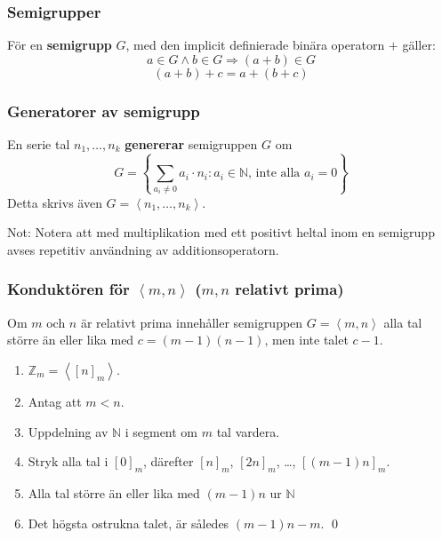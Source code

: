 \documentclass{beamer}
\begin{document}
\begin{frame}
	\frametitle{Semigrupper}
\begin{Definition}
	För en \textbf{semigrupp} $G$, med den implicit definierade binära operatorn $+$ gäller:
	\[a \in G \wedge b \in G \Longrightarrow (a + b) \in G\]
	\[(a+b)+c = a+(b+c)\]
\end{Definition}
\end{frame}

\begin{frame}
	\frametitle{Generatorer av semigrupp}
\begin{Definition}
	En serie tal $n_1, \ldots, n_k$ \textbf{genererar} semigruppen $G$ om
	\[G = \left\{\sum_{a_i\neq 0} a_i \cdot n_i : a_i \in \mathbb{N}\text{, inte alla $a_i=0$}\right\}\]
	Detta skrivs även $G = \left<n_1, \ldots, n_k \right>$.
\end{Definition}

\vspace{20pt}
\scriptsize Not: Notera att med multiplikation med ett positivt heltal inom en semigrupp avses repetitiv användning av additionsoperatorn.
\end{frame}

\begin{frame}
	\frametitle{Konduktören för $\left<m,n\right>$ ($m, n$ relativt prima)}
\begin{Theorem}
	Om $m$ och $n$ är relativt prima innehåller semigruppen $G = \left<m, n\right>$ alla tal större än eller lika med $c = (m - 1)(n - 1)$, men inte talet $c - 1$.
\end{Theorem}

\begin{enumerate}
	\item<3-> $\mathbb{Z}_m = \left<[n]_m\right>$.
	\item<4-> Antag att $m<n$.
	\item<5-> Uppdelning av $\mathbb{N}$ i segment om $m$ tal vardera.
	\item<6-> Stryk alla tal i $[0]_m$, därefter $[n]_m$, $[2n]_m$, \ldots, $\left[(m-1)n\right]_m$.
	\item<7-> Alla tal större än eller lika med $(m-1)n$ ur $\mathbb{N}$
	\item<8-> Det högsta ostrukna talet, är således $(m - 1)n - m$. \qed
\end{enumerate}
\end{frame}
\end{document}
